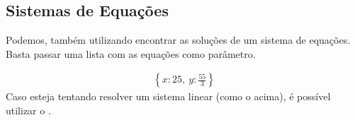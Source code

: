 \documentclass[letterpaper,10pt,english]{jupyterBook}
\begin{document}
\subsection{Sistemas de Equações}
\label{\detokenize{chapters/3:sistemas-de-equacoes}}
\sphinxAtStartPar
Podemos, também utilizando  encontrar as soluções de um sistema de equações. Basta passar uma lista com as equações como parâmetro.

\begin{sphinxVerbatim}[commandchars=\\\{\}]
    
  \PYG{p}{[}\PYG{p}{]}
   
   
  
\end{sphinxVerbatim}
\begin{equation*}
\begin{split}\displaystyle \left\{ x : 25, \  y : \frac{55}{3}\right\}\end{split}
\end{equation*}
\sphinxAtStartPar
Caso esteja tentando resolver um sistema linear (como o acima), é possível utilizar o .
\end{document}
